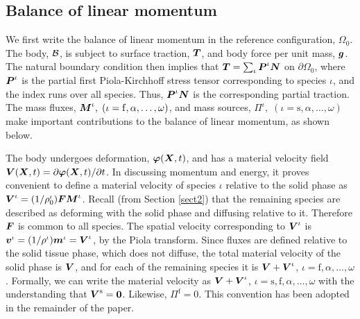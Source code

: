
\subsection{Balance of linear momentum}
\label{balance-of-linear-momentum}

We first write the balance of linear momentum in
the reference configuration, $\Omega_0$. The body, ${\mathcal B}$, is
subject to surface traction, $\mbox{\boldmath$ T$}$, and body force per unit mass,
$\mbox{\boldmath$ g$}$. The natural boundary condition then implies that $\mbox{\boldmath$ T$} =
\sum_{\iota}\mbox{\boldmath$ P$}^\iota\mbox{\boldmath$ N$}$ on $\partial\Omega_0$, where $\mbox{\boldmath$ P$}^\iota$
is the partial first Piola-Kirchhoff stress tensor corresponding
to species $\iota$, and the index runs over all species. Thus,
$\mbox{\boldmath$ P$}^\iota\mbox{\boldmath$ N$}$ is the corresponding partial traction. The mass
fluxes, $\mbox{\boldmath$ M$}^\iota,\;(\iota = \mathrm{f},\alpha,\dots,\omega)$,
and mass sources, $\Pi^\iota,\;(\iota =
\mathrm{s},\alpha,\dots,\omega)$ make important contributions to
the balance of linear momentum, as shown below.

The body undergoes deformation, $\mbox{\boldmath$\varphi$}(\mbox{\boldmath$ X$},t)$, and has a
material velocity field $\mbox{\boldmath$ V$}(\mbox{\boldmath$ X$},t) =
\partial\mbox{\boldmath$\varphi$}(\mbox{\boldmath$ X$},t)/\partial t$. In discussing momentum and energy, it proves convenient to define a
material velocity of species $\iota$ relative to the solid phase
as $\mbox{\boldmath$ V$}^\iota = (1/\rho_0^\iota)\mbox{\boldmath$ F$}\mbox{\boldmath$ M$}^\iota$. Recall (from
Section \ref{sect2}) that the remaining species are described as
deforming with the solid phase and diffusing relative to it.
Therefore $\mbox{\boldmath$ F$}$ is common to all species. The spatial velocity
corresponding to $\mbox{\boldmath$ V$}^\iota$ is $\mbox{\boldmath$ v$}^\iota =
(1/\rho^\iota)\mbox{\boldmath$ m$}^\iota = \mbox{\boldmath$ V$}^\iota$, by the Piola transform.
Since fluxes are defined relative to the solid tissue phase, which
does not diffuse, the total material velocity of the solid phase
is $\mbox{\boldmath$ V$}$, and for each of the remaining species it is $\mbox{\boldmath$ V$} +
\mbox{\boldmath$ V$}^\iota$, $\iota = \mathrm{f},\alpha,\dots,\omega$. Formally, we
can write the material velocity as  $\mbox{\boldmath$ V$} + \mbox{\boldmath$ V$}^\iota$, $\iota =
\mathrm{s},\mathrm{f},\alpha,\dots,\omega$ with the understanding
that $\mbox{\boldmath$ V$}^\mathrm{s} = {\bf 0}$. Likewise, $\Pi^\mathrm{f} = 0$.
This convention has been adopted in the remainder of the paper.

